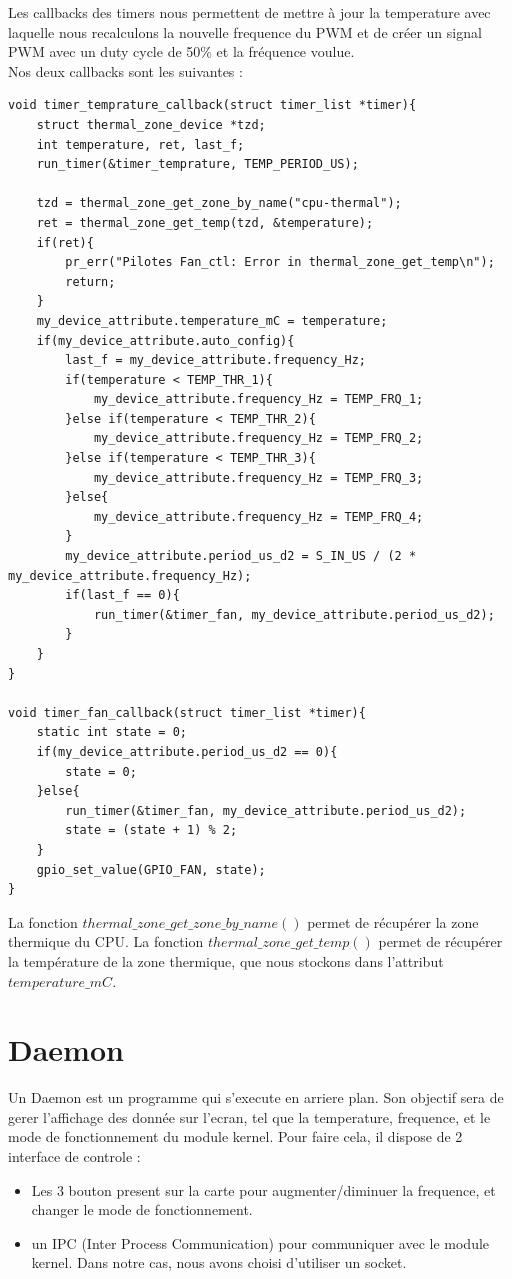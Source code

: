 \documentclass[
	a4paper, %
	10pt, %
]{CSUniSchoolLabReport}
\begin{document}
Les callbacks des timers nous permettent de mettre à jour la temperature avec laquelle nous recalculons la nouvelle frequence du PWM et de créer un signal PWM avec un duty cycle de 50\% et la fréquence voulue. \\
Nos deux callbacks sont les suivantes :
\begin{lstlisting}[style=CStyle]
void timer_temprature_callback(struct timer_list *timer){
	struct thermal_zone_device *tzd;
	int temperature, ret, last_f;
	run_timer(&timer_temprature, TEMP_PERIOD_US);

	tzd = thermal_zone_get_zone_by_name("cpu-thermal");
	ret = thermal_zone_get_temp(tzd, &temperature);
	if(ret){
		pr_err("Pilotes Fan_ctl: Error in thermal_zone_get_temp\n");
		return;
	}
	my_device_attribute.temperature_mC = temperature;
	if(my_device_attribute.auto_config){
		last_f = my_device_attribute.frequency_Hz;
		if(temperature < TEMP_THR_1){
			my_device_attribute.frequency_Hz = TEMP_FRQ_1;
		}else if(temperature < TEMP_THR_2){
			my_device_attribute.frequency_Hz = TEMP_FRQ_2;
		}else if(temperature < TEMP_THR_3){
			my_device_attribute.frequency_Hz = TEMP_FRQ_3;
		}else{
			my_device_attribute.frequency_Hz = TEMP_FRQ_4;
		}
		my_device_attribute.period_us_d2 = S_IN_US / (2 * my_device_attribute.frequency_Hz);
		if(last_f == 0){
			run_timer(&timer_fan, my_device_attribute.period_us_d2);
		}
	}
}

void timer_fan_callback(struct timer_list *timer){
	static int state = 0;
	if(my_device_attribute.period_us_d2 == 0){
		state = 0;
	}else{
		run_timer(&timer_fan, my_device_attribute.period_us_d2);
		state = (state + 1) % 2;
	}
	gpio_set_value(GPIO_FAN, state);
}
\end{lstlisting}

La fonction $thermal\_zone\_get\_zone\_by\_name()$ permet de récupérer la zone thermique du CPU. La fonction $thermal\_zone\_get\_temp()$ permet de récupérer la température de la zone thermique, que nous stockons dans l'attribut $temperature\_mC$. \\

\section{Daemon}\label{Daemon}
Un Daemon est un programme qui s'execute en arriere plan. 
Son objectif sera de gerer l'affichage des donnée sur l'ecran, tel que la temperature, frequence, et le mode de fonctionnement du module kernel.
Pour faire cela, il dispose de 2 interface de controle : \\
\begin{itemize}
	\item Les 3 bouton present sur la carte pour augmenter/diminuer la frequence, et changer le mode de fonctionnement.
	\item un IPC (Inter Process Communication) pour communiquer avec le module kernel. Dans notre cas, nous avons choisi d'utiliser un socket.
\end{itemize}
\end{document}
